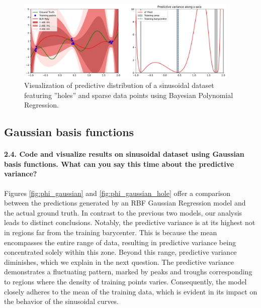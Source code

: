\begin{figure}[H]
    \centering
    \includegraphics[width=0.95\textwidth]{phi_polynomial_hole.pdf}
    \caption{Visualization of predictive distribution of a sinusoidal dataset featuring ''holes'' and sparse data points using Bayesian Polynomial Regression.}
    \label{fig:phi_polynomial_hole}
\end{figure}

\subsection{Gaussian basis functions}

\paragraph*{2.4. Code and visualize results on sinusoidal dataset using Gaussian basis functions. What can you say this time about the predictive variance?}

Figures \ref{fig:phi_gaussian} and \ref{fig:phi_gaussian_hole} offer a comparison between the predictions generated by an RBF Gaussian Regression model and the actual ground truth. In contrast to the previous two models, our analysis leads to distinct conclusions. Notably, the predictive variance is at its highest not in regions far from the training barycenter. This is because the mean encompasses the entire range of data, resulting in predictive variance being concentrated solely within this zone. Beyond this range, predictive variance diminishes, which we explain in the next question. The predictive variance demonstrates a fluctuating pattern, marked by peaks and troughs corresponding to regions where the density of training points varies. Consequently, the model closely adheres to the mean of the training data, which is evident in its impact on the behavior of the sinusoidal curves.


